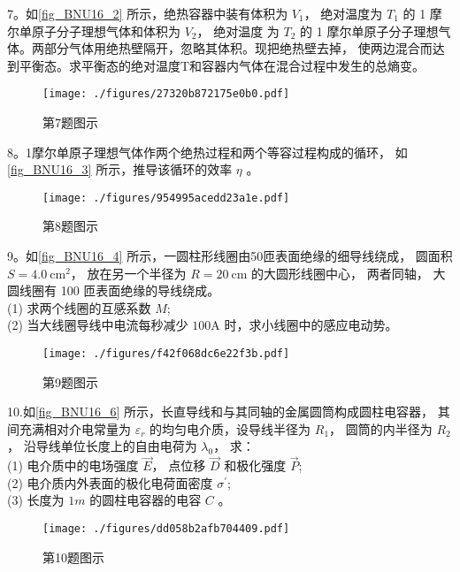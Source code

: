 7。如\autoref{fig_BNU16_2} 所示，绝热容器中装有体积为 $V_{1}$， 绝对温度为 $T_{1}$ 的 1 摩尔单原子分子理想气体和体积为 $V_{2}$， 绝对温度 为 $T_{2}$ 的 1 摩尔单原子分子理想气体。两部分气体用绝热壁隔开，忽略其体积。现把绝热壁去掉， 使两边混合而达到平衡态。求平衡态的绝对温度T和容器内气体在混合过程中发生的总熵变。
\begin{figure}[ht]
\centering
\texttt{[image: ./figures/27320b872175e0b0.pdf]}
\caption{第7题图示} \label{fig_BNU16_2}
\end{figure}
8。1摩尔单原子理想气体作两个绝热过程和两个等容过程构成的循环， 如\autoref{fig_BNU16_3} 所示，推导该循环的效率 $\eta$ 。
\begin{figure}[ht]
\centering
\texttt{[image: ./figures/954995acedd23a1e.pdf]}
\caption{第8题图示} \label{fig_BNU16_3}
\end{figure}
9。如\autoref{fig_BNU16_4} 所示，一圆柱形线圈由50匝表面绝缘的细导线绕成， 圆面积 $S=4.0 \mathrm{~cm}^{2}$， 放在另一个半径为 $R=20 \mathrm{~cm}$ 的大圆形线圈中心， 两者同轴， 大圆线圈有 100 匝表面绝缘的导线绕成。\\
(1) 求两个线圈的互感系数 $M$;\\
(2) 当大线圈导线中电流每秒减少 $100\mathrm{A}$ 时，求小线圈中的感应电动势。
\begin{figure}[ht]
\centering
\texttt{[image: ./figures/f42f068dc6e22f3b.pdf]}
\caption{第9题图示} \label{fig_BNU16_4}
\end{figure}

10.如\autoref{fig_BNU16_6} 所示，长直导线和与其同轴的金属圆筒构成圆柱电容器， 其间充满相对介电常量为 $\varepsilon_{r}$ 的均匀电介质，设导线半径为 $R_{1}$， 圆筒的内半径为 $R_{2}$， 沿导线单位长度上的自由电荷为 $\lambda_{0}$， 求：\\
(1) 电介质中的电场强度 $\vec{E}$， 点位移 $\vec{D}$ 和极化强度 $\vec{P}$;\\
(2) 电介质内外表面的极化电荷面密度 $\sigma^{\prime}$;\\
(3) 长度为 $1 m$ 的圆柱电容器的电容 $C$ 。
\begin{figure}[ht]
\centering
\texttt{[image: ./figures/dd058b2afb704409.pdf]}
\caption{第10题图示} \label{fig_BNU16_6}
\end{figure}

